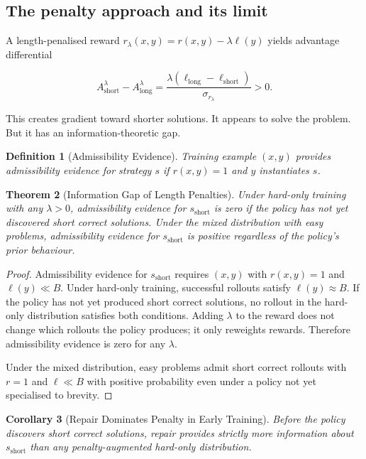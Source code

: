 \documentclass[11pt]{article}
\theoremstyle{rthm}
\newtheorem{theorem}{Theorem}[section]
\newtheorem{corollary}[theorem]{Corollary}
\theoremstyle{rdef}
\newtheorem{definition}[theorem]{Definition}
\theoremstyle{remark}
\begin{document}
\subsection{The penalty approach and its limit}

A length-penalised reward $r_\lambda(x,y) = r(x,y) - \lambda\ell(y)$
yields advantage differential

\[
A_{\mathrm{short}}^\lambda - A_{\mathrm{long}}^\lambda
= \frac{\lambda(\ell_{\mathrm{long}} - \ell_{\mathrm{short}})}{\sigma_{r_\lambda}} > 0.
\]

This creates gradient toward shorter solutions. It appears to solve
the problem. But it has an information-theoretic gap.

\begin{definition}[Admissibility Evidence]
Training example $(x,y)$ provides \emph{admissibility evidence}
for strategy $s$ if $r(x,y) = 1$ and $y$ instantiates $s$.
\end{definition}

\begin{theorem}[Information Gap of Length Penalties]
\label{thm:gap}
Under hard-only training with any $\lambda > 0$, admissibility
evidence for $s_{\mathrm{short}}$ is zero if the policy has not
yet discovered short correct solutions. Under the mixed distribution
with easy problems, admissibility evidence for $s_{\mathrm{short}}$
is positive regardless of the policy's prior behaviour.
\end{theorem}

\begin{proof}
Admissibility evidence for $s_{\mathrm{short}}$ requires $(x,y)$
with $r(x,y)=1$ and $\ell(y) \ll B$. Under hard-only training,
successful rollouts satisfy $\ell(y) \approx B$. If the policy has
not yet produced short correct solutions, no rollout in the hard-only
distribution satisfies both conditions. Adding $\lambda$ to the
reward does not change which rollouts the policy produces; it
only reweights rewards. Therefore admissibility evidence is zero
for any $\lambda$.

Under the mixed distribution, easy problems admit short correct
rollouts with $r = 1$ and $\ell \ll B$ with positive probability
even under a policy not yet specialised to brevity.
\end{proof}

\begin{corollary}[Repair Dominates Penalty in Early Training]
\label{cor:dominance}
Before the policy discovers short correct solutions, repair provides
strictly more information about $s_{\mathrm{short}}$ than any
penalty-augmented hard-only distribution.
\end{corollary}
\end{document}
